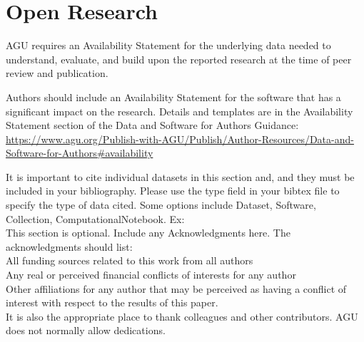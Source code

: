 \documentclass[draft]{agujournal2019}
\begin{document}
%
%


%
%




\section{Open Research}
AGU requires an Availability Statement for the underlying data needed to understand, evaluate, and build upon the reported research at the time of peer review and publication.

Authors should include an Availability Statement for the software that has a significant impact on the research. Details and templates are in the Availability Statement section of the Data and Software for Authors Guidance: \url{https://www.agu.org/Publish-with-AGU/Publish/Author-Resources/Data-and-Software-for-Authors#availability}

It is important to cite individual datasets in this section and, and they must be included in your bibliography. Please use the type field in your bibtex file to specify the type of data cited. Some options include Dataset, Software, Collection, ComputationalNotebook. Ex: 
\\


\acknowledgments
This section is optional. Include any Acknowledgments here.
The acknowledgments should list:\\
All funding sources related to this work from all authors\\
Any real or perceived financial conflicts of interests for any author\\
Other affiliations for any author that may be perceived as having a conflict of interest with respect to the results of this paper.\\
It is also the appropriate place to thank colleagues and other contributors. AGU does not normally allow dedications.
\end{document}
